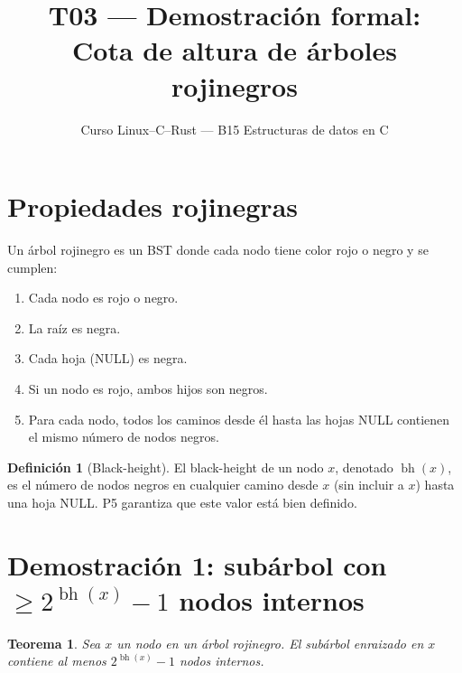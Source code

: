 \documentclass[11pt, letterpaper]{article}
\title{%
  T03 --- Demostración formal:\\[4pt]
  Cota de altura de árboles rojinegros
}
\author{Curso Linux--C--Rust --- B15 Estructuras de datos en C}
\date{}
\theoremstyle{definition}
\newtheorem{definition}{Definición}[section]
\theoremstyle{plain}
\newtheorem{theorem}{Teorema}[section]
\theoremstyle{remark}
\begin{document}
\maketitle
\tableofcontents

\section{Propiedades rojinegras}

Un árbol rojinegro es un BST donde cada nodo tiene color rojo o negro
y se cumplen:

\begin{enumerate}
  \item[\textbf{P1.}] Cada nodo es rojo o negro.
  \item[\textbf{P2.}] La raíz es negra.
  \item[\textbf{P3.}] Cada hoja (NULL) es negra.
  \item[\textbf{P4.}] Si un nodo es rojo, ambos hijos son negros.
  \item[\textbf{P5.}] Para cada nodo, todos los caminos desde él hasta
    las hojas NULL contienen el mismo número de nodos negros.
\end{enumerate}

\begin{definition}[Black-height]
El black-height de un nodo $x$, denotado $\operatorname{bh}(x)$, es el
número de nodos negros en cualquier camino desde $x$ (sin incluir a $x$)
hasta una hoja NULL. P5 garantiza que este valor está bien definido.
\end{definition}

\section{Demostración 1: subárbol con
  \texorpdfstring{$\geq 2^{\operatorname{bh}(x)} - 1$}{>= 2\^bh(x) - 1}
  nodos internos}

\begin{theorem}\label{thm:subtree}
Sea $x$ un nodo en un árbol rojinegro. El subárbol enraizado en $x$
contiene al menos $2^{\operatorname{bh}(x)} - 1$ nodos internos.
\end{theorem}
\end{document}

